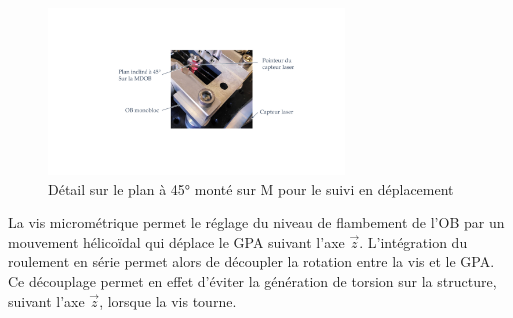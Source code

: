 \begin{figure}[!htbp]
\begin{center}
    \captionsetup{justification=centering}
	\includegraphics[trim={8cm 5cm 5.5cm 5cm},clip, width=0.7\textwidth]{../Chap3/Figure/BDT_detail_plan45.pdf}
	\caption{Détail sur le plan à 45° monté sur M pour le suivi en déplacement}
	\label{fig:BDT_detail_plan45}
\end{center}
\end{figure}

La vis micrométrique permet le réglage du niveau de flambement de l'OB par un mouvement hélicoïdal qui déplace le GPA suivant l'axe $\vec{z}$. L'intégration du roulement en série permet alors de découpler la rotation entre la vis et le GPA. Ce découplage permet en effet d'éviter la génération de torsion sur la structure, suivant l'axe $\vec{z}$, lorsque la vis tourne.

